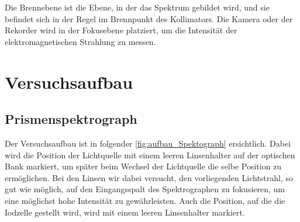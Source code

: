 \documentclass[12pt,english,ngerman]{scrartcl}
\begin{document}
Die Brennebene ist die Ebene, in der das Spektrum gebildet wird, und sie
befindet sich in der Regel im Brennpunkt des Kollimators. Die Kamera oder der
Rekorder wird in der Fokusebene platziert, um die Intensität der
elektromagnetischen Strahlung zu messen.


\section{Versuchsaufbau}\label{sec:aufbau}

\subsection{Prismenspektrograph}

Der Versuchsaufbau ist in folgender \autoref{fig:aufbau_Spektograph}
ersichtlich. Dabei wird die Position der Lichtquelle mit einem leeren
Linsenhalter auf der optischen Bank markiert, um später beim Wechsel der
Lichtquelle die selbe Position zu ermöglichen. Bei den Linsen wir dabei
versucht, den vorliegenden Lichtstrahl, so gut wie möglich, auf den
Eingangsspalt des Spektrographen zu fokusieren, um eine möglichst hohe
Intensität zu gewährleisten. Auch die Position, auf die die Iodzelle gestellt
wird, wird mit einem leeren Linsenhalter markiert.
\end{document}
